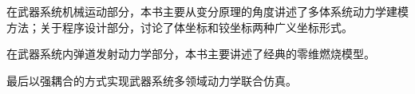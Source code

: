 在武器系统机械运动部分，本书主要从变分原理的角度讲述了多体系统动力学建模方法；关于程序设计部分，讨论了体坐标和铰坐标两种广义坐标形式。

在武器系统内弹道发射动力学部分，本书主要讲述了经典的零维燃烧模型。

最后以强耦合的方式实现武器系统多领域动力学联合仿真。
